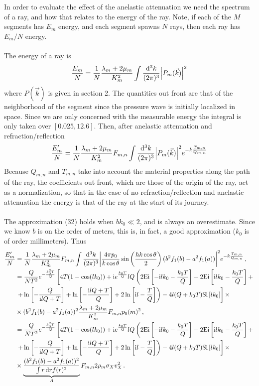 \documentclass{article}
\newcommand*\diff{\mathop{}\!\mathrm{d}}
\newcommand*\te[1]{\text{#1}}
\newcommand*\p[1]{\left(#1\right)}
\newcommand*\ps[1]{\left[#1\right]}
\newcommand*\f[2]{\frac{#1}{#2}}
\newcommand*\I{\te{i}}
\begin{document}
In order to evaluate the effect of the anelastic attenuation we need the spectrum of a ray, and how that relates to the energy of the ray. Note, if each of the $M$ segments has $E_m$ energy, and each segment spawns $N$ rays, then each ray has $E_m/N$ energy.
\\\\
The energy of a ray is
\begin{align}
\f{E_m}{N}=\f{1}{N}\f{\lambda_m+2\mu_m}{K_m^2}\int\f{\diff^3 k}{(2\pi)^3}\abs{P_m(\vec k)}^2
\end{align}
where $P(\vec k)$ is given in section 2. The quantities out front are that of the neighborhood of the segment since the pressure wave is initially localized in space. Since we are only concerned with the measurable energy the integral is only taken over $[0.025,12.6]$. Then, after anelastic attenuation and refraction/reflection
\begin{align}
\f{E_m'}{N}=\f{1}{N}\f{\lambda_m+2\mu_m}{K_m^2}F_{m,n}\int\f{\diff^3 k}{(2\pi)^3}\abs{P_m(\vec k)}^2e^{-k\f{T_{m,n}}{Q_{m,n}}}
\end{align}
Because $Q_{m,n}$ and $T_{m,n}$ take into account the material properties along the path of the ray, the coefficients out front, which are those of the origin of the ray, act as a normalization, so that in the case of no refraction/reflection and anelastic attenuation the energy is that of the ray at the start of its journey.
\\\\
The approximation (32) holds when $bk_0\ll 2$, and is always an overestimate. Since we know $b$ is on the order of meters, this is, in fact, a good approximation ($k_0$ is of order millimeters). Thus
\begin{align}
\f{E_m'}{N} &= \f{1}{N}\f{\lambda_m+2\mu_m}{K_m^2}F_{m,n}\int\f{\diff^3 k}{(2\pi)^3}\abs{\f{4\pi p_0}{k\cos\theta}\sin\p{\f{h k\cos\theta}{2}}(b^2f_1(b)-a^2f_1(a))}^2e^{-k\f{T_{m,n}}{Q_{m,n}}}\,,\\
\notag &=\f{Q}{NT^2}e^{-\f{k_0^2T}{Q}}\ps{4T(1-\cos(l k_0)) + \I e^{\f{k_0 T}{Q}} l Q\p{2\te{Ei}\ps{-\I l \notag k_0-\f{k_0 T}{Q}} - 2\te{Ei}\ps{\I l k_0 - \f{k_0 T}{Q}} + \right.\right.\\&\left.\left.+\ln\ps{-\f{Q}{\I l Q+T}}+\ln\notag \ps{-\f{\I l Q + T}{Q}} + 2\ln\ps{\I l - \f{T}{Q}}} - 4 l(Q + k_0 T)\te{Si}\ps{l k_0}}\times\\
&\times (b^2f_1(b)-a^2f_1(a))^2\f{\lambda_m+2\mu_m}{K_m^2}F_{m,n}p_0(m)^2\,,\\
\notag &=\f{Q}{NT^2}e^{-\f{k_0^2T}{Q}}\ps{4T(1-\cos(l k_0)) + \I e^{\f{k_0 T}{Q}} l Q\p{2\te{Ei}\ps{-\I l \notag k_0-\f{k_0 T}{Q}} - 2\te{Ei}\ps{\I l k_0 - \f{k_0 T}{Q}} + \right.\right.\\&\left.\left.+\ln\ps{-\f{Q}{\I l Q+T}}+\ln\notag \ps{-\f{\I l Q + T}{Q}} + 2\ln\ps{\I l - \f{T}{Q}}} - 4 l(Q + k_0 T)\te{Si}\ps{l k_0}}\times\\
&\times \underbrace{\f{(b^2f_1(b)-a^2f_1(a))^2}{\int r\diff r f(r)^2}}_{A}F_{m,n} 2\rho_m\sigma_Xv_X^2\,.
\end{align}
\end{document}
